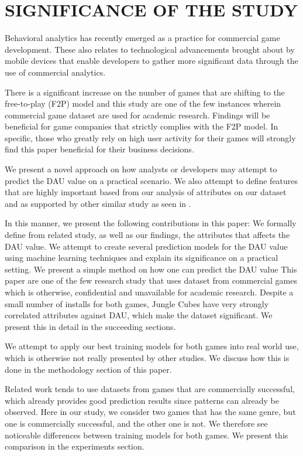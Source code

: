 %
%
%
\section{SIGNIFICANCE OF THE STUDY}
Behavioral analytics has recently emerged as a practice for commercial game development. These also relates to technological advancements brought about by mobile devices that enable developers to gather more significant data through the use of commercial analytics.

There is a significant increase on the number of games that are shifting to the free-to-play (F2P) model and this study are one of the few instances wherein commercial game dataset are used for academic research. Findings will be beneficial for game companies that strictly complies with the F2P model. In specific, those who greatly rely on high user activity for their games will strongly find this paper beneficial for their business decisions.

We present a novel approach on how analysts or developers may attempt to predict the DAU value on a practical scenario. We also attempt to define features that are highly important based from our analysis of attributes on our dataset and as supported by other similar study as seen in \cite{ref:predicting_player_churn}.

In this manner, we present the following contributions in this paper:
We formally define from related study, as well as our findings,  the attributes that affects the DAU value.
We attempt to create several prediction models for the DAU value using machine learning techniques and explain its significance on a practical setting.
We present a simple method on how one can predict the DAU value
This paper are one of the few research study that uses dataset from commercial games which is otherwise, confidential and unavailable for academic research.
Despite a small number of installs for both games, Jungle Cubes have very strongly correlated attributes against DAU, which make the dataset significant. We present this in detail in the succeeding sections.

We attempt to apply our best training models for both games into real world use, which is otherwise not really presented by other studies. We discuss how this is done in the methodology section of this paper. 

Related work tends to use datasets from games that are commercially successful, which already provides good prediction results since patterns can already be observed. Here in our study, we consider two games that has the same genre, but one is commercially successful, and the other one is not. We therefore see noticeable differences between training models for both games. We present this comparison in the experiments section.

